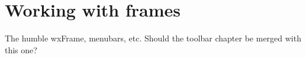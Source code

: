 \chapter{Working with frames}\label{chapframes}
%
%
\setfooter{\thepage}{}{}{}{}{\thepage}%

The humble wxFrame, menubars, etc. Should the toolbar chapter be merged with this one?

